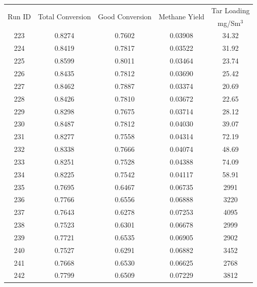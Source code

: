 \documentclass[11pt,twocolumn]{article}
\begin{document}
\begin{center}
\begin{tabular}{ccccc}
\toprule
\multirow{2}{*}{Run ID} &  \multirow{2}{*}{Total Conversion} &  \multirow{2}{*}{Good Conversion} &  \multirow{2}{*}{Methane Yield} & Tar Loading \\
{}	&	{}	&	{}	&	{}	&	mg/Sm$^3$	\\
\midrule
223    &     0.8274 &      0.7602 &        0.03908 &            34.32 \\
224    &     0.8419 &      0.7817 &        0.03522 &            31.92 \\
225    &     0.8599 &      0.8011 &        0.03464 &            23.74 \\
226    &     0.8435 &      0.7812 &        0.03690 &            25.42 \\
227    &     0.8462 &      0.7887 &        0.03374 &            20.69 \\
228    &     0.8426 &      0.7810 &        0.03672 &            22.65 \\
229    &     0.8298 &      0.7675 &        0.03714 &            28.12 \\
230    &     0.8487 &      0.7812 &        0.04030 &            39.07 \\
231    &     0.8277 &      0.7558 &        0.04314 &            72.19 \\
232    &     0.8338 &      0.7666 &        0.04074 &            48.69 \\
233    &     0.8251 &      0.7528 &        0.04388 &            74.09 \\
234    &     0.8225 &      0.7542 &        0.04117 &            58.91 \\
235    &     0.7695 &      0.6467 &        0.06735 &             2991 \\
236    &     0.7766 &      0.6556 &        0.06888 &             3220 \\
237    &     0.7643 &      0.6278 &        0.07253 &             4095 \\
238    &     0.7523 &      0.6301 &        0.06678 &             2999 \\
239    &     0.7721 &      0.6535 &        0.06905 &             2902 \\
240    &     0.7527 &      0.6291 &        0.06882 &             3452 \\
241    &     0.7668 &      0.6530 &        0.06625 &             2768 \\
242    &     0.7799 &      0.6509 &        0.07229 &             3812 \\

\end{tabular}
\end{center}
\end{document}
